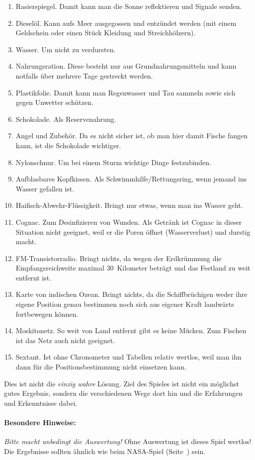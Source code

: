 	\begin{enumerate}
		\item Rasierspiegel. Damit kann man die Sonne reflektieren und Signale senden.
		\item Dieselöl. Kann aufs Meer ausgegossen und entzündet werden (mit einem Geldschein oder einen Stück Kleidung und Streichhölzern).
		\item Wasser. Um nicht zu verdursten.
		\item Nahrungsration. Diese besteht nur aus Grundnahrungsmitteln und kann notfalls über mehrere Tage gestreckt werden.
		\item Plastikfolie. Damit kann man Regenwasser und Tau sammeln sowie sich gegen Unwetter schützen.
		\item Schokolade. Als Reservenahrung.
		\item Angel und Zubehör. Da es nicht sicher ist, ob man hier damit Fische fangen kann, ist die Schokolade wichtiger.
		\item Nylonschnur. Um bei einem Sturm wichtige Dinge festzubinden.
		\item Aufblasbares Kopfkissen. Als Schwimmhilfe/Rettungsring, wenn jemand ins Wasser gefallen ist.
		\item Haifisch-Abwehr-Flüssigkeit. Bringt nur etwas, wenn man ins Wasser geht.
		\item Cognac. Zum Desinfizieren von Wunden. Als Getränk ist Cognac in dieser Situation nicht geeignet, weil er die Poren öffnet (Wasserverlust) und durstig macht.
		\item FM-Transistorradio. Bringt nichts, da wegen der Erdkrümmung die Empfangsreichweite maximal 30~Kilometer beträgt und das Festland zu weit entfernt ist.
		\item Karte von indischen Ozean. Bringt nichts, da die Schiffbrüchigen weder ihre eigene Position genau bestimmen noch sich aus eigener Kraft landwärts fortbewegen können.
		\item Moskitonetz. So weit von Land entfernt gibt es keine Mücken. Zum Fischen ist das Netz auch nicht geeignet.
		\item Sextant. Ist ohne Chronometer und Tabellen relativ wertlos, weil man ihn dann für die Positionsbestimmung nicht einsetzen kann.
	\end{enumerate}
Dies ist nicht die \emph{einzig wahre} Lösung. Ziel des Spieles ist nicht ein möglichst gutes Ergebnis, sondern die verschiedenen Wege dort hin und die Erfahrungen und Erkenntnisse dabei.

\paragraph{Besondere Hinweise:} \emph{Bitte macht unbedingt die Auswertung!} Ohne Auswertung ist dieses Spiel wertlos! Die Ergebnisse sollten ähnlich wie beim NASA-Spiel (Seite~\pageref{nasa}) sein.

